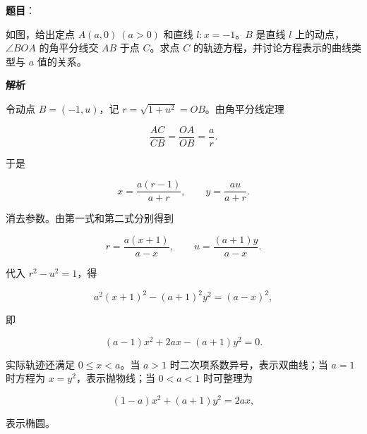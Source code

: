 \begin{answer}

\textbf{题目}：

如图，给出定点 $A(a,0)\ (a>0)$ 和直线 $l:x=-1$。$B$ 是直线 $l$ 上的动点，$\angle BOA$ 的角平分线交 $AB$ 于点 $C$。求点 $C$ 的轨迹方程，并讨论方程表示的曲线类型与 $a$ 值的关系。
\nopagebreak[4]
\begin{center}\end{center}
\nopagebreak[4]
\textbf{解析}

令动点 $B=(-1,u)$，记 $r=\sqrt{1+u^2}=OB$。由角平分线定理

\nopagebreak[4]
\[
\frac{AC}{CB}=\frac{OA}{OB}=\frac ar.
\]

于是

\nopagebreak[4]
\[
x=\frac{a(r-1)}{a+r},\qquad y=\frac{au}{a+r}.
\]

消去参数。由第一式和第二式分别得到

\nopagebreak[4]
\[
r=\frac{a(x+1)}{a-x},\qquad
u=\frac{(a+1)y}{a-x}.
\]

代入 $r^2-u^2=1$，得

\nopagebreak[4]
\[
a^2(x+1)^2-(a+1)^2y^2=(a-x)^2,
\]

即

\nopagebreak[4]
\[
(a-1)x^2+2ax-(a+1)y^2=0.
\]

实际轨迹还满足 $0\le x<a$。当 $a>1$ 时二次项系数异号，表示双曲线；当 $a=1$ 时方程为 $x=y^2$，表示抛物线；当 $0<a<1$ 时可整理为

\nopagebreak[4]
\[
(1-a)x^2+(a+1)y^2=2ax,
\]

表示椭圆。


\end{answer}